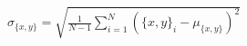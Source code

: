 \documentclass[preview]{standalone}
\begin{document}
\begin{align*}
\sigma_{\{x,y\}} = \sqrt{\frac{1}{N-1}\sum_{i=1}^{N}(\{x,y\}_i - \mu_{\{x,y\}})^2}
\end{align*}
\end{document}
